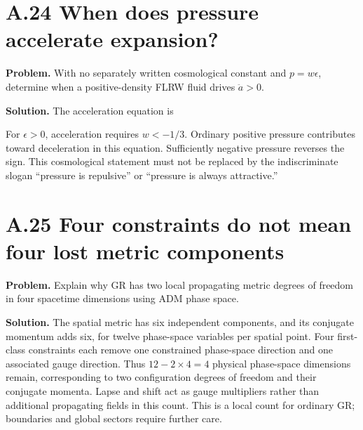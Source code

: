 \documentclass[
  11pt,
  letterpaper,
  oneside,
  openany]{scrbook}
\begin{document}
\hypertarget{a.24-when-does-pressure-accelerate-expansion}{%
\section{A.24 When does pressure accelerate
expansion?}\label{a.24-when-does-pressure-accelerate-expansion}}

\textbf{Problem.} With no separately written cosmological constant and
\(p=w\epsilon\), determine when a positive-density FLRW fluid drives
\(\ddot a>0\).

\textbf{Solution.} The acceleration equation is

\begin{center}
\begingroup
{}
\ifdim\wd\grmathbox>\linewidth
\resizebox{\linewidth}{!}{\usebox{\grmathbox}}
\else\usebox{\grmathbox}\fi
\endgroup
\end{center}

For \(\epsilon>0\), acceleration requires \(w<-1/3\). Ordinary positive
pressure contributes toward deceleration in this equation. Sufficiently
negative pressure reverses the sign. This cosmological statement must
not be replaced by the indiscriminate slogan ``pressure is repulsive''
or ``pressure is always attractive.''

\hypertarget{a.25-four-constraints-do-not-mean-four-lost-metric-components}{%
\section{A.25 Four constraints do not mean four lost metric
components}\label{a.25-four-constraints-do-not-mean-four-lost-metric-components}}

\textbf{Problem.} Explain why GR has two local propagating metric
degrees of freedom in four spacetime dimensions using ADM phase space.

\textbf{Solution.} The spatial metric has six independent components,
and its conjugate momentum adds six, for twelve phase-space variables
per spatial point. Four first-class constraints each remove one
constrained phase-space direction and one associated gauge direction.
Thus \(12-2\times4=4\) physical phase-space dimensions remain,
corresponding to two configuration degrees of freedom and their
conjugate momenta. Lapse and shift act as gauge multipliers rather than
additional propagating fields in this count. This is a local count for
ordinary GR; boundaries and global sectors require further care.
\end{document}
